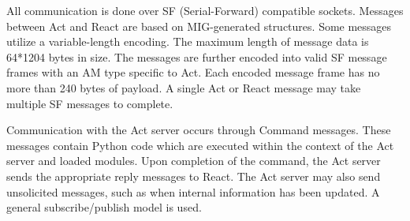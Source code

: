 All communication is done over SF (Serial-Forward) compatible
sockets. Messages between Act and React are based on MIG-generated
structures. Some messages utilize a variable-length encoding. The
maximum length of message data is 64*1204 bytes in size. The messages
are further encoded into valid SF message frames with an AM type
specific to Act. Each encoded message frame has no more than 240 bytes
of payload. A single Act or React message may take multiple SF
messages to complete.

Communication with the Act server occurs through Command
messages. These messages contain Python code which are executed within
the context of the Act server and loaded modules. Upon completion of
the command, the Act server sends the appropriate reply messages to
React. The Act server may also send unsolicited messages, such as when
internal information has been updated. A general subscribe/publish
model is used.


